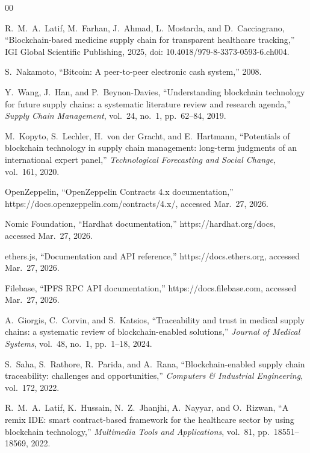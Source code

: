 \documentclass[conference]{IEEEtran}
\begin{document}
\begin{thebibliography}{00}

R.\ M.\ A.\ Latif, M.\ Farhan, J.\ Ahmad, L.\ Mostarda, and D.\ Cacciagrano, ``Blockchain-based medicine supply chain for transparent healthcare tracking,'' IGI Global Scientific Publishing, 2025, doi: 10.4018/979-8-3373-0593-6.ch004.

S.\ Nakamoto, ``Bitcoin: A peer-to-peer electronic cash system,'' 2008.

Y.\ Wang, J.\ Han, and P.\ Beynon-Davies, ``Understanding blockchain technology for future supply chains: a systematic literature review and research agenda,'' \textit{Supply Chain Management}, vol.~24, no.~1, pp.~62--84, 2019.

M.\ Kopyto, S.\ Lechler, H.\ von der Gracht, and E.\ Hartmann, ``Potentials of blockchain technology in supply chain management: long-term judgments of an international expert panel,'' \textit{Technological Forecasting and Social Change}, vol.~161, 2020.

OpenZeppelin, ``OpenZeppelin Contracts 4.x documentation,'' https://docs.openzeppelin.com/contracts/4.x/, accessed Mar.\ 27, 2026.

Nomic Foundation, ``Hardhat documentation,'' https://hardhat.org/docs, accessed Mar.\ 27, 2026.

ethers.js, ``Documentation and API reference,'' https://docs.ethers.org, accessed Mar.\ 27, 2026.

Filebase, ``IPFS RPC API documentation,'' https://docs.filebase.com, accessed Mar.\ 27, 2026.

A.\ Giorgis, C.\ Corvin, and S.\ Katsios, ``Traceability and trust in medical supply chains: a systematic review of blockchain-enabled solutions,'' \textit{Journal of Medical Systems}, vol.~48, no.~1, pp.~1--18, 2024.

S.\ Saha, S.\ Rathore, R.\ Parida, and A.\ Rana, ``Blockchain-enabled supply chain traceability: challenges and opportunities,'' \textit{Computers \& Industrial Engineering}, vol.~172, 2022.

R.\ M.\ A.\ Latif, K.\ Hussain, N.\ Z.\ Jhanjhi, A.\ Nayyar, and O.\ Rizwan, ``A remix IDE: smart contract-based framework for the healthcare sector by using blockchain technology,'' \textit{Multimedia Tools and Applications}, vol.~81, pp.~18551--18569, 2022.


\end{thebibliography}
\end{document}
